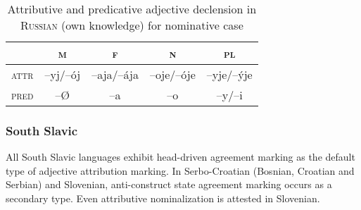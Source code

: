 \begin{table}[h]
\begin{center}
\begin{footnotesize}
\begin{tabular}[t]{l|c c c c}
\hline
\hline
			&\textsc{m}	&\textsc{f}		&\textsc{n}	&\textsc{pl}\\
\hline
\textsc{attr}	&–yj/–ój		&–aja/–ája	&–oje/–óje	&–yje/–\'yje\\
\textsc{pred}	&–{Ø}		&–a			&–o			&–y/–i\\
			\hline
			\hline
\end{tabular}
\caption[Adjective paradigm for \textsc{Russian}]{Attributive and predicative adjective declension in \textsc{Russian} (own knowledge) for nominative case}
\label{Russian adj agr paradigm}
\end{footnotesize}
\end{center}
\end{table}

\subsubsection{South Slavic} \label{s-slavic synchr}
All South Slavic languages exhibit head-driven agreement marking as the default type of adjective attribution marking. In Serbo-Croatian (Bosnian, Croatian and Serbian) and Slovenian, anti-construct state agreement marking occurs as a secondary type. Even attributive nominalization is attested in Slovenian.

